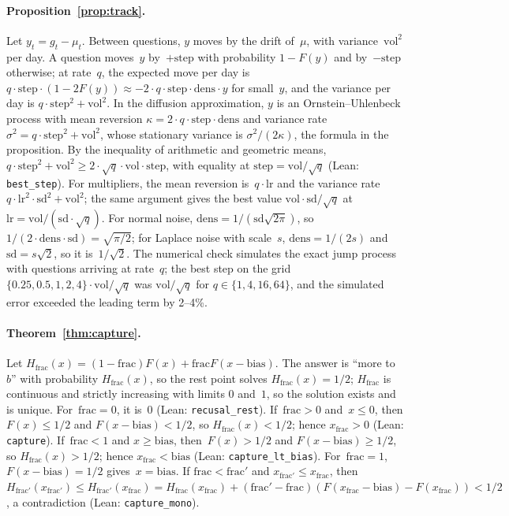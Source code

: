 \documentclass[doubleblind]{ecai}
\theoremstyle{remark}
\newcommand{\step}{\mathrm{step}}
\newcommand{\lr}{\mathrm{lr}}
\newcommand{\vol}{\mathrm{vol}}
\newcommand{\dens}{\mathrm{dens}}
\newcommand{\sd}{\mathrm{sd}}
\newcommand{\bias}{\mathrm{bias}}
\newcommand{\frc}{\mathrm{frac}}
\begin{document}
\paragraph{Proposition~\ref{prop:track}.}
Let $y_t = g_t - \mu_t$. Between questions, $y$ moves by the drift of~$\mu$, with variance~$\vol^2$ per day. A question moves~$y$ by~$+\step$ with probability $1-F(y)$ and by~$-\step$ otherwise; at rate~$q$, the expected move per day is $q\cdot\step\cdot(1-2F(y)) \approx -2\cdot q\cdot\step\cdot\dens\cdot y$ for small~$y$, and the variance per day is $q\cdot\step^2 + \vol^2$. In the diffusion approximation, $y$ is an Ornstein--Uhlenbeck process with mean reversion $\kappa = 2\cdot q\cdot\step\cdot\dens$ and variance rate $\sigma^2 = q\cdot\step^2+\vol^2$, whose stationary variance is $\sigma^2/(2\kappa)$, the formula in the proposition. By the inequality of arithmetic and geometric means, $q\cdot\step^2 + \vol^2 \ge 2\cdot\sqrt q\cdot\vol\cdot\step$, with equality at $\step = \vol/\sqrt q$ (Lean: \texttt{best\_step}). For multipliers, the mean reversion is~$q\cdot\lr$ and the variance rate $q\cdot\lr^2\cdot\sd^2 + \vol^2$; the same argument gives the best value $\vol\cdot\sd/\sqrt q$ at $\lr = \vol/(\sd\cdot\sqrt q)$. For normal noise, $\dens = 1/(\sd\sqrt{2\pi})$, so $1/(2\cdot\dens\cdot\sd) = \sqrt{\pi/2}$; for Laplace noise with scale~$s$, $\dens = 1/(2s)$ and $\sd = s\sqrt2$, so it is~$1/\sqrt 2$. The numerical check simulates the exact jump process with questions arriving at rate~$q$; the best step on the grid $\{0.25, 0.5, 1, 2, 4\}\cdot\vol/\sqrt q$ was $\vol/\sqrt q$ for $q \in \{1,4,16,64\}$, and the simulated error exceeded the leading term by 2--4\%.

\paragraph{Theorem~\ref{thm:capture}.}
Let $H_{\frc}(x) = (1-\frc)F(x) + \frc F(x-\bias)$. The answer is ``more to~$b$'' with probability $H_{\frc}(x)$, so the rest point solves $H_{\frc}(x) = 1/2$; $H_{\frc}$ is continuous and strictly increasing with limits $0$ and~$1$, so the solution exists and is unique. For~$\frc = 0$, it is~$0$ (Lean: \texttt{recusal\_rest}). If~$\frc>0$ and~$x\le 0$, then $F(x)\le 1/2$ and $F(x-\bias)<1/2$, so $H_{\frc}(x)<1/2$; hence $x_{\frc} > 0$ (Lean: \texttt{capture}). If~$\frc<1$ and $x \ge \bias$, then~$F(x) > 1/2$ and $F(x-\bias) \ge 1/2$, so $H_{\frc}(x) > 1/2$; hence $x_{\frc} < \bias$ (Lean: \texttt{capture\_lt\_bias}). For~$\frc = 1$, $F(x - \bias) = 1/2$ gives~$x = \bias$. If $\frc < \frc'$ and $x_{\frc'} \le x_{\frc}$, then $H_{\frc'}(x_{\frc'}) \le H_{\frc'}(x_{\frc}) = H_{\frc}(x_{\frc}) + (\frc'-\frc)(F(x_{\frc}-\bias) - F(x_{\frc})) < 1/2$, a contradiction (Lean: \texttt{capture\_mono}).
\end{document}
